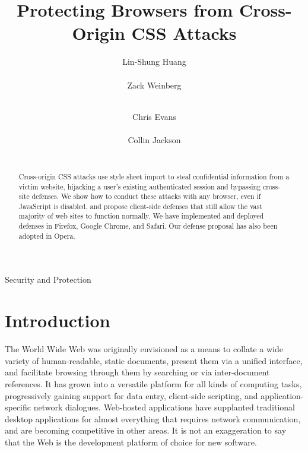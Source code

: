 \documentclass{acm_proc_article-sp}
\begin{document}
\itemsep 0pt
\partopsep 0pt
\topsep 0pt

\title{Protecting Browsers from Cross-Origin CSS Attacks}
\author{
\alignauthor
Lin-Shung Huang\\
      \\
\alignauthor
Zack Weinberg\\
      \\
\and
\alignauthor
Chris Evans\\
      \\
\alignauthor
Collin Jackson\\
      \\
}

\newcommand{\todo}[1]{\textbf{[TODO: #1]}}

\maketitle
\begin{abstract}
Cross-origin CSS attacks use style sheet import to steal confidential
information from a victim website, hijacking a user's existing
authenticated session and bypassing cross-site defenses.  We show how
to conduct these attacks with any browser, even if JavaScript is
disabled, and propose client-side defenses that still allow the vast
majority of web sites to function normally. We have implemented and
deployed defenses in Firefox, Google Chrome, and Safari. Our defense
proposal has also been adopted in Opera.
\end{abstract}

                {Security and Protection}



\section{Introduction}

The World Wide Web was originally envisioned \cite{wwwproposal} as a
means to collate a wide variety of human-readable, static documents,
present them via a unified interface, and facilitate browsing through
them by searching or via inter-document references. It has grown into
a versatile platform for all kinds of computing tasks, progressively
gaining support for data entry, client-side scripting, and
application-specific network dialogues.  Web-hosted applications have
supplanted traditional desktop applications for almost everything that
requires network communication, and are becoming competitive in other
areas.  It is not an exaggeration to say that the Web is the
development platform of choice for new software.
\end{document}
